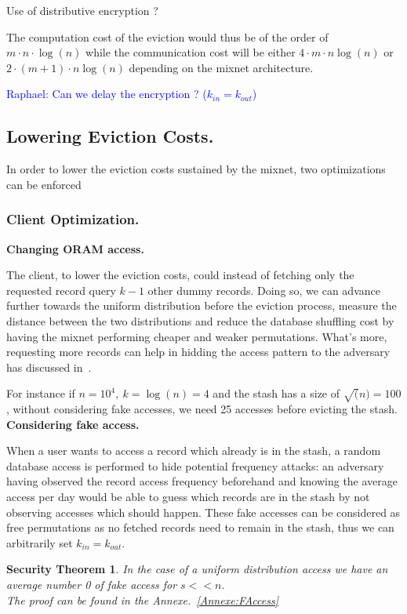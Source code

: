 \documentclass[conference]{IEEEtran}
\newtheorem{secthm}{Security Theorem}
\newcommand{\raphael}[1]{\textcolor{blue}{Raphael: #1}}
\begin{document}
Use of distributive encryption ?

The computation cost of the eviction would thus be of the order of $m\cdot n \cdot \log(n)$ while the communication cost will be either $4\cdot m \cdot n \log(n)$ or $2\cdot(m+1) \cdot n \log(n)$ depending on the mixnet architecture.

\raphael{Can we delay the encryption ? ($k_{in}=k_{out}$)}

\subsection{Lowering Eviction Costs.}

In order to lower the eviction costs sustained by the mixnet, two optimizations can be enforced

\subsubsection{Client Optimization.}
\noindent\textbf{Changing ORAM access.}

The client, to lower the eviction costs, could instead of fetching only the requested record query $k-1$ other dummy records. Doing so, we can advance further towards the uniform distribution before the eviction process, measure the distance between the two distributions and reduce the database shuffling cost by having the mixnet performing cheaper and weaker permutations.
What's more, requesting more records can help in hidding the access pattern to the adversary has discussed in~\cite{Lower cost PIR}.

For instance if $n=10^4,\ k=\log(n)=4$ and the stash has a size of $\sqrt(n)=100$, without considering fake accesses, we need 25 accesses before evicting the stash.\\

\noindent\textbf{Considering fake access.}

When a user wants to access a record which already is in the stash, a random database access is performed to hide potential frequency attacks: an adversary having observed the record access frequency beforehand and knowing the average access per day would be able to guess which records are in the stash by not observing accesses which should happen.
These fake accesses can be considered as free permutations as no fetched records need to remain in the stash, thus we can arbitrarily set $k_{in}=k_{out}$.

\begin{secthm}
In the case of a uniform distribution access we have an average number 0 of fake access for $s<<n$.\\
The proof can be found in the Annexe.~\ref{Annexe:FAccess}
\end{secthm}
\end{document}
